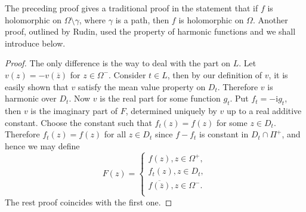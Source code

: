 The preceding proof gives a traditional proof in the statement that if $f$ is holomorphic on $\Omega\setminus\gamma$, where $\gamma$ is a path, then $f$ is holomorphic on $\Omega$. Another proof, outlined by Rudin, used the property of harmonic functions and we shall introduce below.
\begin{proof}
The only difference is the way to deal with the part on $L$. Let $v(z)=-v(\overline{z})$ for $z\in\Omega^-$. Consider $t\in L$, then by our definition of $v$, it is easily shown that $v$ satisfy the mean value property on $D_t$. Therefore $v$ is harmonic over $D_t$. Now $v$ is the real part for some function $g_t$. Put $f_t=-\mathrm{i}g_t$, then $v$ is the imaginary part of $F$, determined uniquely by $v$ up to a real additive constant. Choose the constant such that $f_t(z)=f(z)$ for some $z\in D_t$. Therefore $f_t(z)=f(z)$ for all $z\in D_t$ since $f-f_t$ is constant in $D_t\cap\Pi^+$, and hence we may define 
$$
F\left( z \right) =\begin{cases}
	f\left( z \right) ,z\in \Omega ^+,\\
	f_t\left( z \right) ,z\in D_t,\\
	\overline{f\left( \overline{z} \right) },z\in \Omega ^-.\\
\end{cases}
$$
The rest proof coincides with the first one.
\end{proof}
